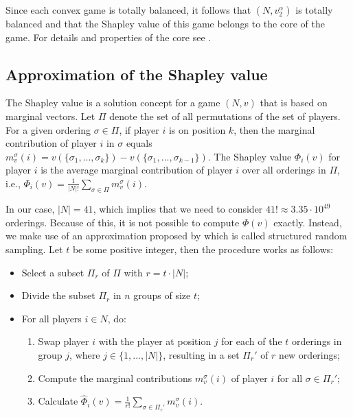 \documentclass[10p]{article}
\theoremstyle{definition}
\theoremstyle{definition}
\begin{document}
Since each convex game is totally balanced, it follows that $(N,v_2^\alpha)$ is totally balanced and that the Shapley value of this game belongs to the core of the game. For details and properties of the core see \cite{borm2001operations}.
\subsection{Approximation of the Shapley value}
The Shapley value is a solution concept for a game $(N,v)$ that is based on marginal vectors. Let $\Pi$ denote the set of all permutations of the set of players. For a given ordering $\sigma \in \Pi$, if player $i$ is on position $k$, then the marginal contribution of player $i$ in $\sigma$ equals $m_v^\sigma(i) = v(\{\sigma_1, ..., \sigma_k\}) - v(\{\sigma_1, ..., \sigma_{k-1}\})$. The Shapley value $\Phi_i(v)$ for player $i$ is the average marginal contribution of player $i$ over all orderings in $\Pi$, i.e., $\Phi_i(v) = \frac{1}{|N|!}\sum_{\sigma \in \Pi}m_v^\sigma (i)$. 

In our case, $|N| = 41$, which implies that we need to consider $41! \approx 3.35 \cdot 10^{49}$ orderings. Because of this, it is not possible to compute $\Phi(v)$ exactly. Instead, we make use of an approximation proposed by \cite{campen2018new} which is called structured random sampling. Let $t$ be some positive integer, then the procedure works as follows:
\begin{itemize} \itemsep0em 
    \item Select a subset $\Pi_r$ of $\Pi$ with $r = t \cdot |N|$;
    \item Divide the subset $\Pi_r$ in $n$ groups of size $t$;
    \item For all players $i \in N$, do:
    \begin{enumerate} \itemsep0em 
        \item Swap player $i$ with the player at position $j$ for each of the $t$ orderings in group $j$, where $j \in \{1, ..., |N|\}$, resulting in a set $\Pi_r'$ of $r$ new orderings;
        \item Compute the marginal contributions $m_v^\sigma(i)$ of player $i$ for all $\sigma \in \Pi_r'$;
        \item Calculate $\hat{\Phi}_i(v) = \frac{1}{r !}\sum_{\sigma \in \Pi_r'}m_v^\sigma(i)$.
    \end{enumerate}
\end{itemize}
\end{document}
